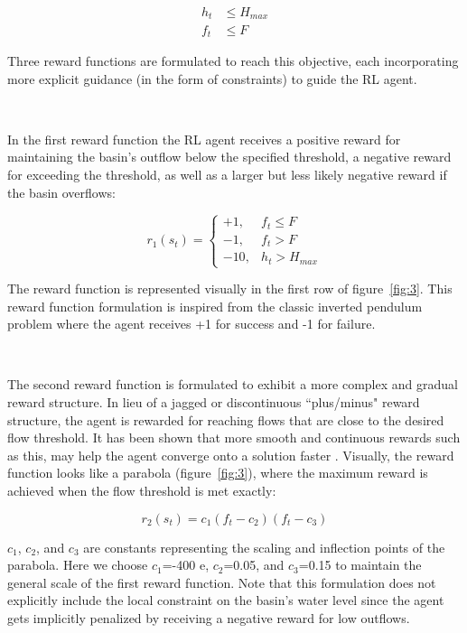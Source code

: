 \begin{align}
    h_t &\leq H_{max} \\
    f_t &\leq F
\end{align}

Three reward functions are formulated to reach this objective, each incorporating more explicit guidance (in the form of constraints) to guide the RL agent.

\

In the first reward function the RL agent receives a positive reward for maintaining the basin’s outflow below the specified threshold, a negative reward for exceeding the threshold, as well as a larger but less likely negative reward if the basin overflows:

\begin{equation}
r_1 (s_t )= \begin{cases}
		+1, & f_t \leq F\\
		-1, & f_t > F\\
		-10,& h_t > H_{max}
	\end{cases}
\end{equation}

The reward function is represented visually in the first row of figure~\ref{fig:3}.
This reward function formulation is inspired from the classic inverted pendulum problem \cite{Watkins1992Q-learning} where the agent receives +1 for success and -1 for failure.

\

The second reward function is formulated to exhibit a more complex and gradual reward structure.
In lieu of a jagged or discontinuous ``plus/minus" reward structure, the agent is rewarded for reaching flows that are close to the desired flow threshold.
It has been shown that more smooth and continuous rewards such as this, may help the agent converge onto a solution faster \cite{Sutton98, aytar2018playing}.
Visually, the reward function looks like a parabola (figure~\ref{fig:3}), where the maximum reward is achieved when the flow threshold is met exactly:

\begin{equation}
r_2 (s_t )= c_1 (f_t-c_2 )(f_t- c_3 )
\end{equation}

$c_1$, $c_2$, and $c_3$ are constants representing the scaling and inflection points of the parabola.
Here we choose $c_1$=-400 e, $c_2$=0.05, and $c_3$=0.15 to maintain the general scale of the first reward function.
Note that this formulation does not explicitly include the local constraint on the basin’s water level since the agent gets implicitly penalized by receiving a negative reward for low outflows.

